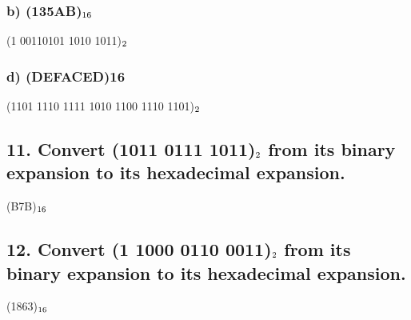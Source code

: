 \documentclass[11pt, oneside]{article} %
\numberwithin{equation}{section} %
\numberwithin{figure}{section} %
\numberwithin{table}{section} %
\begin{document}
\subsubsection{b) (135AB)$\textsubscript{16}$}
(1 00110101 1010 1011)$\textsubscript{2}$
\subsubsection{d) (DEFACED)16}
(1101 1110 1111 1010 1100 1110 1101)$\textsubscript{2}$


\subsection{11. Convert (1011 0111 1011)$\textsubscript{2}$ from its binary expansion to its hexadecimal expansion.}
(B7B)$\textsubscript{16}$


\subsection{12. Convert (1 1000 0110 0011)$\textsubscript{2}$ from its binary expansion to its hexadecimal expansion.}
(1863)$\textsubscript{16}$
\end{document}
